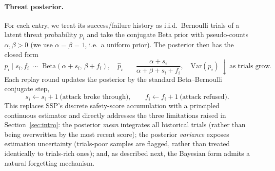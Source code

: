 \paragraph{Threat posterior.} For each entry, we treat its success/failure history as i.i.d.\ Bernoulli trials of a latent threat probability $p_i$ and take the conjugate Beta prior with pseudo-counts $\alpha,\beta>0$ (we use $\alpha=\beta=1$, i.e.\ a uniform prior). The posterior then has the closed form
\begin{equation}
  p_i\mid s_i,f_i \;\sim\; \mathrm{Beta}(\alpha+s_i,\,\beta+f_i),\quad
  \hat p_i \;=\; \frac{\alpha+s_i}{\alpha+\beta+s_i+f_i},\quad
  \mathrm{Var}(p_i)\ \downarrow\ \text{as trials grow.}
  \label{eq:posterior}
\end{equation}
Each replay round updates the posterior by the standard Beta--Bernoulli conjugate step,
\begin{equation}
  s_i \leftarrow s_i+1 \ \text{(attack broke through)},\qquad
  f_i \leftarrow f_i+1 \ \text{(attack refused)}.
  \label{eq:beta-update}
\end{equation}
This replaces SSP's discrete safety-score accumulation with a principled continuous estimator and directly addresses the three limitations raised in Section~\ref{sec:intro}: the posterior \emph{mean} integrates all historical trials (rather than being overwritten by the most recent score); the posterior \emph{variance} exposes estimation uncertainty (trials-poor samples are flagged, rather than treated identically to trials-rich ones); and, as described next, the Bayesian form admits a natural forgetting mechanism.

